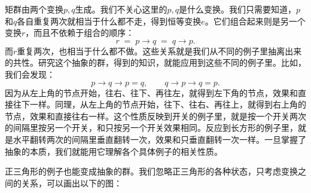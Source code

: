 \documentclass[12pt,UTF8,fontset=none]{ctexbook}
\begin{document}
\vspace{12pt}
矩群由两个变换$p,q$生成。我们不关心这里的$p,q$是什么变换。我们只需要知道，$p$和$q$各自重复两次就相当于什么都不走，得到恒等变换$e$。它们组合起来则是另一个变换$r$，而且不依赖于组合的顺序：
$$ r \;=\; p\rightarrow q \;=\; q\rightarrow p. $$
而$r$重复两次，也相当于什么都不做。这些关系就是我们从不同的例子里抽离出来的共性。研究这个抽象的群，得到的知识，就能应用到这些不同的例子里。比如，我们会发现：
$$ p\rightarrow q\rightarrow p = q, \qquad q\rightarrow p \rightarrow q = p. $$
因为从左上角的节点开始，往右、往下、再往左，就得到左下角的节点，效果和直接往下一样。同理，从左上角的节点开始，往下、往右、再往上，就得到右上角的节点，效果和直接往右一样。这个性质反映到开关的例子里，就是按一个开关两次的间隔里按另一个开关，和只按另一个开关效果相同。反应到长方形的例子里，就是水平翻转两次的间隔里垂直翻转一次，效果和只垂直翻转一次一样。一旦掌握了抽象的本质，我们就能用它理解各个具体例子的相关性质。

正三角形的例子也能变成抽象的群。我们忽略正三角形的各种状态，只考虑变换之间的关系，可以画出以下的图：
\end{document}
